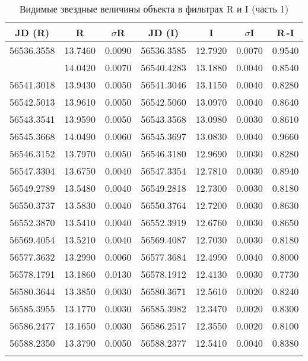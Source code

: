 \begin{table}[h]
  \centering
  \caption{Видимые звездные величины объекта в фильтрах R и I (часть 1)}
  \begin{tabular}{ccccccc}
    \toprule
    JD (R) &
    R &
    $\sigma$R &
    JD (I) &
    I &
    $\sigma$I &
    R\,-I \\
    \midrule
    56536.3558 & 13.7460 & 0.0090 & 56536.3585 & 12.7920 & 0.0070 & 0.9540 \\
    \arrayrulecolor{black!40}
    \midrule
    56540.4226 & 14.0420 & 0.0070 & 56540.4283 & 13.1880 & 0.0040 & 0.8540 \\
    \midrule
    56541.3018 & 13.9430 & 0.0050 & 56541.3046 & 13.1150 & 0.0040 & 0.8280 \\
    \midrule
    56542.5013 & 13.9610 & 0.0050 & 56542.5060 & 13.0970 & 0.0040 & 0.8640 \\
    \midrule
    56543.3541 & 13.9590 & 0.0050 & 56543.3568 & 13.0980 & 0.0030 & 0.8610 \\
    \midrule
    56545.3668 & 14.0490 & 0.0060 & 56545.3697 & 13.0830 & 0.0040 & 0.9660 \\
    \midrule
    56546.3152 & 13.7970 & 0.0050 & 56546.3180 & 12.9690 & 0.0030 & 0.8280 \\
    \midrule
    56547.3304 & 13.6750 & 0.0040 & 56547.3354 & 12.7810 & 0.0030 & 0.8940 \\
    \midrule
    56549.2789 & 13.5480 & 0.0040 & 56549.2818 & 12.7300 & 0.0030 & 0.8180 \\
    \midrule
    56550.3737 & 13.5830 & 0.0040 & 56550.3764 & 12.7200 & 0.0030 & 0.8630 \\
    \midrule
    56552.3870 & 13.5410 & 0.0040 & 56552.3919 & 12.6760 & 0.0030 & 0.8650 \\
    \midrule
    56569.4054 & 13.5210 & 0.0040 & 56569.4087 & 12.7030 & 0.0030 & 0.8180 \\
    \midrule
    56577.3632 & 13.2990 & 0.0060 & 56577.3684 & 12.4990 & 0.0040 & 0.8000 \\
    \midrule
    56578.1791 & 13.1860 & 0.0130 & 56578.1912 & 12.4130 & 0.0030 & 0.7730 \\
    \midrule
    56580.3644 & 13.3850 & 0.0030 & 56580.3671 & 12.5610 & 0.0020 & 0.8240 \\
    \midrule
    56585.3955 & 13.1770 & 0.0030 & 56585.3982 & 12.3470 & 0.0020 & 0.8300 \\
    \midrule
    56586.2477 & 13.1650 & 0.0030 & 56586.2517 & 12.3550 & 0.0020 & 0.8100 \\
    \midrule
    56588.2350 & 13.3790 & 0.0050 & 56588.2377 & 12.5410 & 0.0040 & 0.8380 \\
    \arrayrulecolor{black}
    \bottomrule
  \end{tabular}
\end{table}

